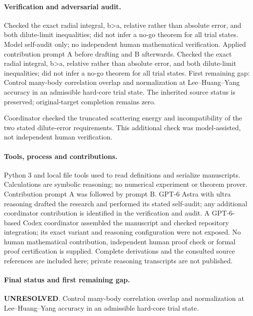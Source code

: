 \documentclass[11pt]{article}
\begin{document}
\paragraph{Verification and adversarial audit.}
Checked the exact radial integral, b>a, relative rather than absolute error, and both dilute-limit inequalities; did not infer a no-go theorem for all trial states. Model self-audit only; no independent human mathematical verification. Applied contribution prompt A before drafting and B afterwards. Checked the exact radial integral, b>a, relative rather than absolute error, and both dilute-limit inequalities; did not infer a no-go theorem for all trial states. First remaining gap: Control many-body correlation overlap and normalization at Lee--Huang--Yang accuracy in an admissible hard-core trial state. The inherited source status is preserved; original-target completion remains zero.

Coordinator checked the truncated scattering energy and incompatibility of the two stated dilute-error requirements. This additional check was model-assisted, not independent human verification.

\paragraph{Tools, process and contributions.}
Python 3 and local file tools used to read definitions and serialize manuscripts. Calculations are symbolic reasoning; no numerical experiment or theorem prover. Contribution prompt A was followed by prompt B. GPT-6 Astra with ultra reasoning drafted the research and performed its stated self-audit; any additional coordinator contribution is identified in the verification and audit. A GPT-6-based Codex coordinator assembled the manuscript and checked repository integration; its exact variant and reasoning configuration were not exposed. No human mathematical contribution, independent human proof check or formal proof certification is supplied. Complete derivations and the consulted source references are included here; private reasoning transcripts are not published.

\paragraph{Final status and first remaining gap.}
\textbf{UNRESOLVED}. Control many-body correlation overlap and normalization at Lee--Huang--Yang accuracy in an admissible hard-core trial state.
\end{document}
